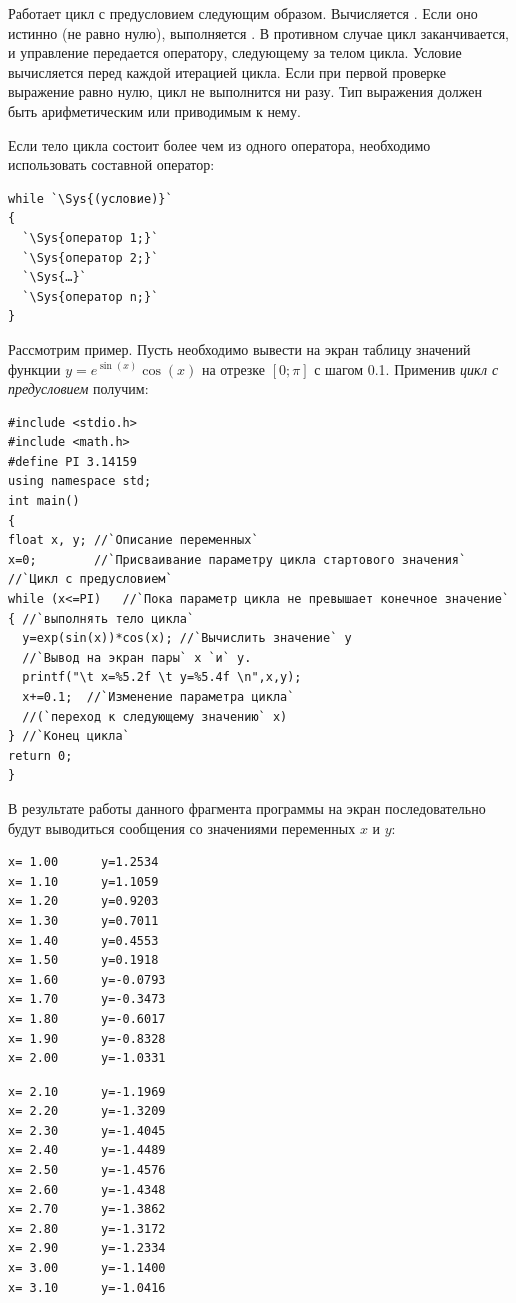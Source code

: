 Работает цикл с предусловием следующим образом. Вычисляется . Если оно истинно (не равно
нулю), выполняется . В противном случае цикл заканчивается, и управление передается
оператору, следующему за телом цикла. Условие вычисляется перед каждой итерацией цикла. Если при первой проверке
выражение равно нулю, цикл не выполнится ни разу. Тип выражения должен быть арифметическим или приводимым к нему. 

Если тело цикла состоит более чем из одного оператора, необходимо использовать составной оператор:
\begin{lstlisting}
while `\Sys{(условие)}`
{
  `\Sys{оператор 1;}`
  `\Sys{оператор 2;}`
  `\Sys{…}`
  `\Sys{оператор n;}`
}
\end{lstlisting}

Рассмотрим пример. Пусть необходимо вывести на экран таблицу значений функции  $y=e^{\sin (x)}\cos (x)$ на отрезке 
$[0;\pi]$ с шагом 0.1. Применив \emph{цикл с предусловием} получим:
\begin{lstlisting}
#include <stdio.h>
#include <math.h>
#define PI 3.14159
using namespace std;
int main()
{
float x, y; //`Описание переменных`
x=0;        //`Присваивание параметру цикла стартового значения`
//`Цикл с предусловием`
while (x<=PI)	//`Пока параметр цикла не превышает конечное значение`
{ //`выполнять тело цикла`
  y=exp(sin(x))*cos(x); //`Вычислить значение` y
  //`Вывод на экран пары` x `и` y.
  printf("\t x=%5.2f \t y=%5.4f \n",x,y);
  x+=0.1;  //`Изменение параметра цикла` 
  //(`переход к следующему значению` x)
} //`Конец цикла`
return 0;
}
\end{lstlisting}

В результате работы данного фрагмента программы на экран последовательно будут выводиться сообщения со значениями
переменных $x$ и $y$\label{ch03:out0}:%

\smallskip
\noindent%
\begin{minipage}{.3\textwidth}
\begin{verbatim}
x= 1.00      y=1.2534 
x= 1.10      y=1.1059 
x= 1.20      y=0.9203 
x= 1.30      y=0.7011 
x= 1.40      y=0.4553 
x= 1.50      y=0.1918 
x= 1.60      y=-0.0793 
x= 1.70      y=-0.3473 
x= 1.80      y=-0.6017 
x= 1.90      y=-0.8328 
x= 2.00      y=-1.0331
\end{verbatim}
\end{minipage}
\begin{minipage}{.3\textwidth}
\begin{verbatim}
x= 2.10      y=-1.1969 
x= 2.20      y=-1.3209 
x= 2.30      y=-1.4045 
x= 2.40      y=-1.4489 
x= 2.50      y=-1.4576 
x= 2.60      y=-1.4348 
x= 2.70      y=-1.3862 
x= 2.80      y=-1.3172 
x= 2.90      y=-1.2334 
x= 3.00      y=-1.1400 
x= 3.10      y=-1.0416 
\end{verbatim}
\end{minipage}
\hfill

